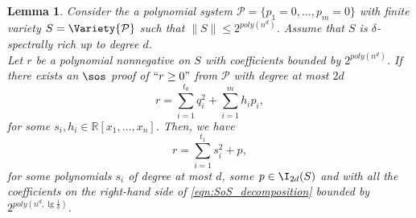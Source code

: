 \documentclass[11pt]{article}
\newtheorem{lemma}[theorem]{Lemma}
\begin{document}
\begin{lemma}\label{th:SOS_decomposition}
    Consider the a polynomial system $\mathcal{P} = \{p_1 = 0, \ldots, p_m = 0\}$ with finite variety $S = \Variety{\mathcal{P}}$ such that $\| S \| \leq 2^{poly(n^d)}$. Assume that $S$ is $\delta$-spectrally rich up to degree $d$. \\
    Let $r$ be a polynomial nonnegative on $S$ with coefficients bounded by $2^{poly(n^d)}$. If there exists an $\sos$ proof of $``r \geq 0"$ from $\mathcal{P}$ with degree at most $2d$
    \begin{equation}\label{original-SOS}
        r = \sum_{i=1}^{t_0} q_i^2 + \sum_{i=1}^m h_i p_i,
    \end{equation}
    for some $s_i, h_i \in \mathbb{R}[x_1, \ldots, x_n]$. Then, we have
    \begin{equation}\label{eqn:SoS_decomposition}
        r = \sum_{i=1}^{t_1} s_i^2 + p,
    \end{equation}
    for some polynomials $s_i$ of degree at most $d$, some $p\in \I_{2d}(S)$ and with all the coefficients on the right-hand side of \eqref{eqn:SoS_decomposition} bounded by $2^{poly(n^d, \lg \frac{1}{\delta})}$.
\end{lemma}
\end{document}
